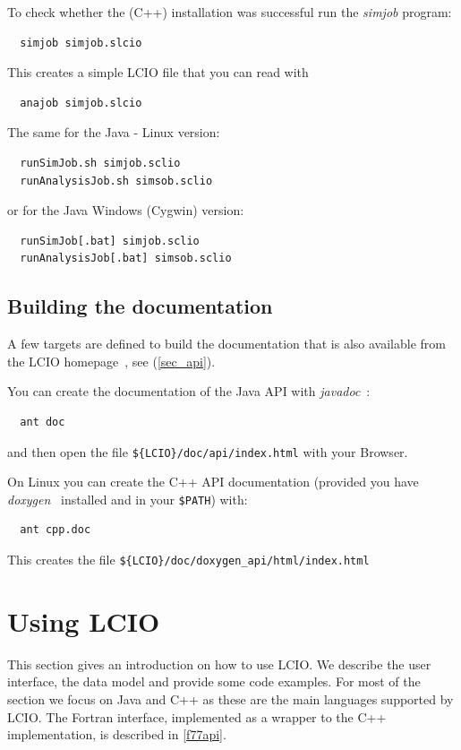 \documentclass[twoside]{article}
\begin{document}
To check whether the (C++) installation was successful run the {\it simjob} program:
\begin{verbatim}
  simjob simjob.slcio
\end{verbatim}
This creates a simple LCIO file that you can read with 
\begin{verbatim}
  anajob simjob.slcio
\end{verbatim}
The same for the Java - Linux version:
\begin{verbatim}
  runSimJob.sh simjob.sclio
  runAnalysisJob.sh simsob.sclio
\end{verbatim}
or for the Java Windows (Cygwin) version:
\begin{verbatim}
  runSimJob[.bat] simjob.sclio
  runAnalysisJob[.bat] simsob.sclio
\end{verbatim}

\subsection {Building the documentation} \label{build_doc}

A few targets are defined to build the documentation that is also available from the 
LCIO homepage~\cite{lcio_home}, see (\ref{sec_api}).

You can create the documentation of the Java API with {\em javadoc}~\cite{ref_javadoc}:
\begin{verbatim}
  ant doc 
\end{verbatim}
and then open the file \verb|${LCIO}/doc/api/index.html| with your Browser. %

\vspace{\baselineskip}
On Linux you can create the C++ API documentation (provided you have {\em doxygen}~\cite{ref_doxygen} 
installed and in your \verb|$PATH|) %
with:
\begin{verbatim}
  ant cpp.doc      
\end{verbatim}
This creates the file \verb|${LCIO}/doc/doxygen_api/html/index.html|   %

\newpage
\section{Using LCIO}
This section gives an introduction on how to use LCIO. We describe the user interface, the data model and
provide some code examples. For most of the section we focus on Java and C++ as these are the main 
languages supported by LCIO. 
The Fortran interface, implemented as a wrapper to the C++ implementation, is described 
in \ref{f77api}. 
\end{document}
